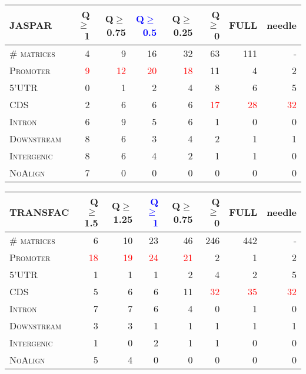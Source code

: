 \documentclass{article}
\begin{document}
\begin{center}

\noindent\begin{minipage}{\linewidth}%
\begin{center}%


\begin{tabular}{|>{\scshape}l||r|r|r|r|r|r||r|}
\hline
\rowcolor[gray]{0.9}
\color{black} \bfseries \scshape \textbf{JASPAR} $~~~~~$ & Q$\geq$1 & Q$\geq$0.75 & \color{black} \bfseries \scshape \textcolor{blue}{Q$\geq$0.5} & Q$\geq$0.25 & Q$\geq$0 & \textbf{FULL} & needle\\
\hline
\# matrices & 4 & 9 & 16 & 32 & 63 & 111 & -\\
\hline\hline
Promoter & \textcolor{red}{9} & \textcolor{red}{12} & \textcolor{red}{20} & \textcolor{red}{18} & 11 & 4 & 2\\
\hline
5'UTR & 0 & 1 & 2 & 4 & 8 & 6 & 5\\
\hline
CDS & 2 & 6 & 6 & 6 & \textcolor{red}{17} & \textcolor{red}{28} & \textcolor{red}{32}\\
\hline
Intron & 6 & 9 & 5 & 6 & 1 & 0 & 0\\
\hline
Downstream & 8 & 6 & 3 & 4 & 2 & 1 & 1\\
\hline
Intergenic & 8 & 6 & 4 & 2 & 1 & 1 & 0\\
\hline
NoAlign & 7 & 0 & 0 & 0 & 0 & 0 & 0\\
\hline
\end{tabular}

\vspace{0.25cm}

\begin{tabular}{|>{\scshape}l||r|r|r|r|r|r||r|}
\hline
\rowcolor[gray]{0.9}
\color{black} \bfseries \scshape \textbf{TRANSFAC} & Q$\geq$1.5 & Q$\geq$1.25 &\color{black} \bfseries \scshape \textcolor{blue}{Q$\geq$1} & Q$\geq$0.75 & Q$\geq$0 & \textbf{FULL} & needle\\
\hline
\# matrices & 6 & 10 & 23 & 46 & 246 & 442 & -\\
\hline\hline
Promoter & \textcolor{red}{18} & \textcolor{red}{19} & \textcolor{red}{24} & \textcolor{red}{21} & 2 & 1 & 2\\
\hline
5'UTR & 1 & 1 & 1 & 2 & 4 & 2 & 5\\
\hline
CDS & 5 & 6 & 6 & 11 & \textcolor{red}{32} & \textcolor{red}{35} & \textcolor{red}{32}\\
\hline
Intron & 7 & 7 & 6 & 4 & 0 & 1 & 0\\
\hline
Downstream & 3 & 3 & 1 & 1 & 1 & 1 & 1\\
\hline
Intergenic & 1 & 0 & 2 & 1 & 1 & 0 & 0\\
\hline
NoAlign & 5 & 4 & 0 & 0 & 0 & 0 & 0\\
\hline
\end{tabular}
\end{center}%
\end{minipage}%

\end{center}%
\end{document}
